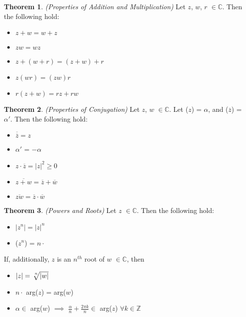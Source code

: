 \documentclass[a4paper]{article}
\theoremstyle{definition}
\newtheorem{theorem}{Theorem}
\begin{document}
	
	\begin{theorem}
		\emph{(Properties of Addition and Multiplication)}
		Let $z$, $w$, $r$ $\in \mathbb{C}$. Then the following hold:
		\begin{itemize}
			\item $z + w = w + z$
			\item $zw = wz$
			\item $z + (w + r) = (z + w) + r$
			\item $z(wr) = (zw)r$
			\item $r(z + w) = rz + rw$
		\end{itemize}
	\end{theorem}
	
	\begin{theorem}
		\emph{(Properties of Conjugation)}
		Let $z$, $w$ $\in \mathbb{C}$. Let ($z$) = $\alpha$, and ($\overline{z}$) = $\alpha'$. Then the following hold:
		\begin{itemize}
			\item $\overline{\overline{z}} = z$
			\item $\alpha'$ = $-\alpha$
			\item $z \cdot \overline{z} = |z|^2 \geq 0$
			\item $\overline{z + w} = \overline{z} + \overline{w}$
			\item $\overline{zw} = \overline{z} \cdot \overline{w}$
		\end{itemize}
	\end{theorem}
	
	\begin{theorem}
		\emph{(Powers and Roots)}
		Let $z$ $\in \mathbb{C}$. Then the following hold:
		\begin{itemize}
			\item $|z^n| = |z|^n$
			\item {}($z^n$) = $n \cdot$ 
		\end{itemize}
		If, additionally, $z$ is an $n^{th}$ root of $w$ $\in \mathbb{C}$, then
		\begin{itemize}
			\item $|z| = \sqrt[\leftroot{-2}\uproot{2}n]{|w|}$
			\item $n \cdot$ arg($z$) = arg($w$)
			\item $\alpha \in$ arg($w$) $\implies$ $\frac{\alpha}{n} + \frac{2 \pi k}{n} \in$ arg($z$) $\forall k \in \mathbb{Z}$
		\end{itemize}
	\end{theorem}
	
\end{document}
